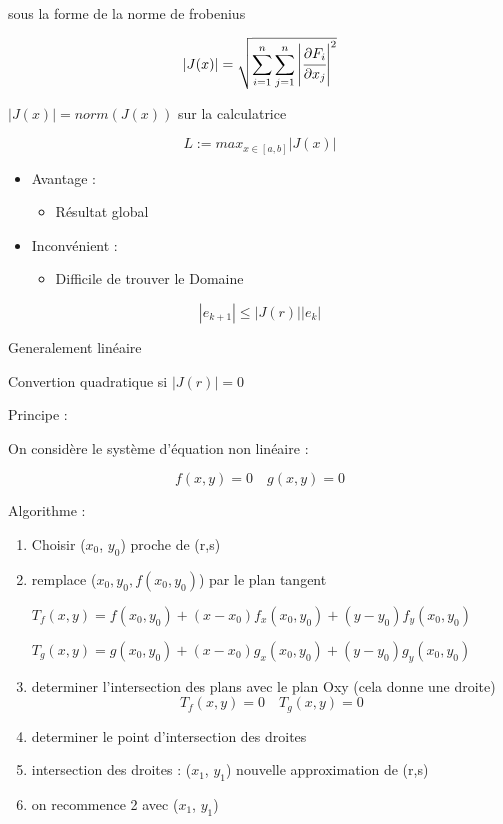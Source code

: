 \\
sous la forme de la norme de frobenius

$$|J(x)| = \sqrt{\sum_{i=1}^{n} \sum_{j=1}^{n} \left\lvert \cfrac{\partial F_i}{\partial x_j} \right\rvert^2}$$

$|J(x)| = norm(J(x))$ sur la calculatrice

$$ L := max_{x \in [a,b]} |J(x)|$$


\begin{itemize}
    \item Avantage : 
    \begin{itemize}
        \item Résultat global 
    \end{itemize}
    \item Inconvénient : 
    \begin{itemize}
        \item Difficile de trouver le Domaine
    \end{itemize}
\end{itemize}


$$|e_{k+1}| \leq |J(r)| |e_k|$$

Generalement linéaire

Convertion quadratique si $|J(r)| = 0$


Principe :

On considère le système d'équation non linéaire :

$$f(x,y) = 0 \quad g(x,y) = 0$$

Algorithme :

\begin{enumerate}
    \item Choisir ($x_0$, $y_0$) proche de (r,s)
    \item remplace ($x_0, y_0,f(x_0, y_0)$) par le plan tangent

    {\hspace*{-1.5cm}$ T_f(x,y) = f(x_0, y_0) + (x-x_0) f_x(x_0, y_0) + (y-y_0) f_y(x_0, y_0)$}
    
    {\hspace*{-1.5cm}$ T_g(x,y) = g(x_0, y_0) + (x-x_0) g_x(x_0, y_0) + (y-y_0) g_y(x_0, y_0)$}
    
    \item determiner l'intersection des plans avec le plan Oxy (cela donne une droite)
    \hspace{-1cm}$$T_f(x,y) = 0 \quad T_g(x,y) = 0$$

    \item determiner le point d'intersection des droites
    \item intersection des droites : ($x_1$, $y_1$) nouvelle approximation de (r,s)
    \item on recommence 2 avec ($x_1$, $y_1$)
\end{enumerate}


